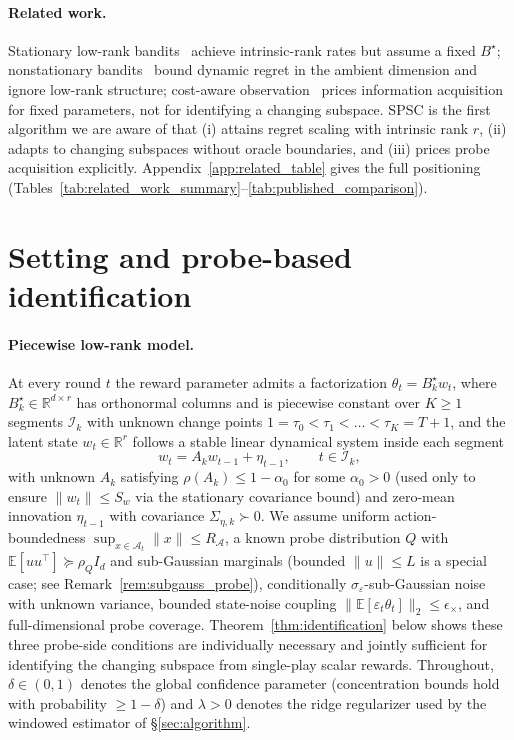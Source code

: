 \documentclass{article}
\newcommand{\R}{\mathbb{R}}
\newcommand{\E}{\mathbb{E}}
\newcommand{\cA}{\mathcal{A}}
\newcommand{\cI}{\mathcal{I}}
\begin{document}
\paragraph{Related work.}
Stationary low-rank
bandits~\citep{jun2019bilinear,kang2022efficient,jedra2024low,jang2024efficient,stojanovic2023spectral,duong2024beyond,lu2021low}
achieve intrinsic-rank rates but assume a fixed $B^\star$;
nonstationary
bandits~\citep{russac2019weighted,cheung2019learning,abbasi2023new,hou2024almost,kim2022improved}
bound dynamic regret in the ambient dimension and ignore low-rank
structure; cost-aware
observation~\citep{seldin2014prediction,tucker2023bandits,elumar2024multi}
prices information acquisition for fixed parameters, not for
identifying a changing subspace. SPSC is the first algorithm we
are aware of that (i) attains regret scaling with intrinsic rank
$r$, (ii) adapts to changing subspaces without oracle boundaries,
and (iii) prices probe acquisition explicitly.
Appendix~\ref{app:related_table} gives the full positioning
(Tables~\ref{tab:related_work_summary}--\ref{tab:published_comparison}).

\section{Setting and probe-based identification}
\label{sec:setting}

\paragraph{Piecewise low-rank model.}
At every round $t$ the reward parameter admits a factorization
$\theta_t = B_k^\star w_t$, where $B_k^\star \in \R^{d\times r}$ has
orthonormal columns and is piecewise constant over $K\ge 1$ segments
$\cI_k$ with unknown change points
$1=\tau_0<\tau_1<\dots<\tau_K=T{+}1$, and the latent state $w_t\in
\R^r$ follows a stable linear dynamical system inside each segment
\[
 w_t = A_k w_{t-1} + \eta_{t-1}, \qquad t \in \cI_k,
\]
with unknown $A_k$ satisfying $\rho(A_k)\le 1{-}\alpha_0$ for some
$\alpha_0>0$ (used only to ensure $\|w_t\|\le S_w$ via the stationary
covariance bound) and zero-mean innovation $\eta_{t-1}$ with
covariance $\Sigma_{\eta,k}\succ 0$. We
assume uniform action-boundedness $\sup_{x\in\cA_t}\|x\|\le R_\cA$,
a known probe distribution $Q$ with $\E[uu^\top]\succeq \rho_Q I_d$ and
sub-Gaussian marginals (bounded $\|u\|\le L$ is a special case; see
Remark~\ref{rem:subgauss_probe}), conditionally
$\sigma_\varepsilon$-sub-Gaussian noise with unknown variance, bounded
state-noise coupling
$\|\E[\varepsilon_t\theta_t]\|_2 \le \epsilon_\times$, and
full-dimensional probe coverage. Theorem~\ref{thm:identification}
below shows these three probe-side conditions are individually
necessary and jointly sufficient for identifying the changing
subspace from single-play scalar rewards. Throughout, $\delta\in(0,1)$
denotes the global confidence parameter (concentration bounds hold
with probability $\ge 1-\delta$) and $\lambda>0$ denotes the ridge
regularizer used by the windowed estimator of \S\ref{sec:algorithm}.
\end{document}
